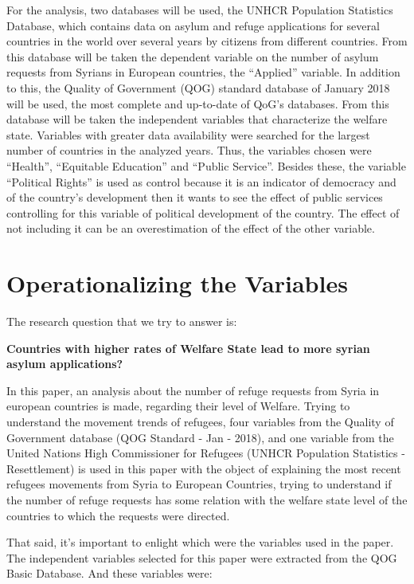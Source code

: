 \documentclass[]{elsarticle} %
\begin{document}
For the analysis, two databases will be used, the UNHCR Population
Statistics Database, which contains data on asylum and refuge
applications for several countries in the world over several years by
citizens from different countries. From this database will be taken the
dependent variable on the number of asylum requests from Syrians in
European countries, the ``Applied'' variable. In addition to this, the
Quality of Government (QOG) standard database of January 2018 will be
used, the most complete and up-to-date of QoG's databases. From this
database will be taken the independent variables that characterize the
welfare state. Variables with greater data availability were searched
for the largest number of countries in the analyzed years. Thus, the
variables chosen were ``Health'', ``Equitable Education'' and ``Public
Service''. Besides these, the variable ``Political Rights'' is used as
control because it is an indicator of democracy and of the country's
development then it wants to see the effect of public services
controlling for this variable of political development of the country.
The effect of not including it can be an overestimation of the effect of
the other variable.

\section{Operationalizing the
Variables}\label{operationalizing-the-variables}

The research question that we try to answer is:

\textbf{Countries with higher rates of Welfare State lead to more syrian
asylum applications?}

In this paper, an analysis about the number of refuge requests from
Syria in european countries is made, regarding their level of Welfare.
Trying to understand the movement trends of refugees, four variables
from the Quality of Government database (QOG Standard - Jan - 2018), and
one variable from the United Nations High Commissioner for Refugees
(UNHCR Population Statistics - Resettlement) is used in this paper with
the object of explaining the most recent refugees movements from Syria
to European Countries, trying to understand if the number of refuge
requests has some relation with the welfare state level of the countries
to which the requests were directed.

That said, it's important to enlight which were the variables used in
the paper. The independent variables selected for this paper were
extracted from the QOG Basic Database. And these variables were:
\end{document}
